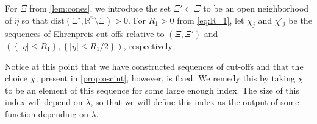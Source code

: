 \documentclass[
	fontsize=11pt, 
	twoside=false, 
	abstract=true, 
	a4paper,
]{scrartcl}
\newcommand{\RR}{\mathbb{R}}
\newcommand{\abs}[1]{\left\lvert#1\right\rvert}
\newcommand{\del}{\partial}
\newcommand{\supp}{\mathrm{supp}}
\newcommand{\td}[1]{\tilde{#1}}
\begin{document}

For $\Xi$ from \cref{lem:cones}, we introduce the set $\Xi' \subset \Xi$ to be an open neighborhood of $\hat \eta$ so that $\mathrm{dist}(\Xi', \RR^n\setminus\Xi) > 0$. 
For $R_1 > 0$ from \cref{eq:R_1}, 
let $\chi_{j}$ and $\chi'_{j}$ be the sequences of Ehrenpreis cut-offs relative to $(\Xi,\Xi')$ and $\left(\left\{\abs{\eta} \leq R_1\right\}, \left\{\abs{\eta} \leq R_1/2\right\}\right)$, respectively. 

Notice at this point that we have constructed sequences of cut-offs and that the choice $\chi$, present in \cref{prop:oscint}, however, is fixed. We remedy this by taking $\chi$ to be an element of this sequence for some large enough index. The size of this index will depend on $\lambda$, so that we will define this index as the output of some function depending on $\lambda$. %
\end{document}
